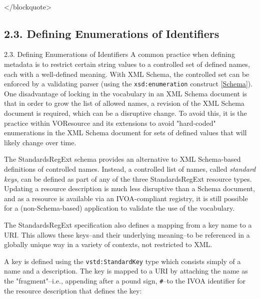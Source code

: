 \documentclass[11pt,a4paper]{ivoa}
\begin{document}
{{\begin{table}
\begin{tabular}[FIXTHIS]
\begin{description}
\end{description}

\\

\end{tabular}
\end{table}
</blockquote>

\subsection{2.3. Defining Enumerations of Identifiers }

\label{}

2.3. Defining Enumerations of Identifiers 
A common practice when defining metadata is to restrict
certain string values to a controlled set of defined names, each with 
a well-defined meaning.  With XML
Schema, the controlled set can be enforced by a validating parser 
(using the \texttt{xsd:enumeration} construct
[\href{#schema}{Schema}]).  One disadvantage of locking in the
vocabulary in an XML Schema document is that in order to grow the list
of allowed names, a revision of the XML Schema document is required,
which can be a disruptive change.  To avoid this, it is the practice
within VOResource and its extensions to avoid "hard-coded"
enumerations in the XML Schema document for sets of defined values
that will likely change over time.  



The StandardsRegExt schema provides an alternative to XML Schema-based
definitions of controlled names.  Instead, a controlled list of names,
called \emph{standard keys}, can be defined as part of any of the three
StandardsRegExt resource types.  Updating a resource description is much
less disruptive than a Schema document, and as a resource is available
via an IVOA-compliant registry, it is still possible for a
(non-Schema-based) application to validate the use of the vocabulary.  



The StandardsRegExt specification also defines a mapping from a key name to
a URI.  This allows these keys--and their underlying meaning--to be
referenced in a globally unique way in a variety of contexts, not
restricted to XML.



A key is defined using the \texttt{vstd:StandardKey} type which
consists simply of a name and a description.  The key is mapped to a
URI by attaching the name as the "fragment"--i.e., appending after a
pound sign, \texttt{#}--to the IVOA identifier for the resource
description that defines the key:



}}
\end{document}
